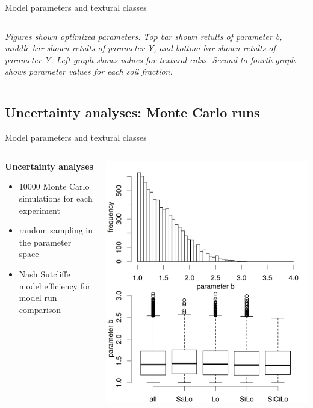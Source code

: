 \begin{block}{Model parameters and textural classes}
\begin{columns}
\begin{column}{0.8\textwidth}
        {\it Figures shown optimized parameters. Top bar shown retults of parameter b, middle bar shown retults of parameter Y, and bottom bar shown retults of parameter Y. Left graph shows values for textural calss. Second to fourth graph shows parameter values for each soil fraction.}
    \end{column}
\end{columns} 

\end{block}

% 
\subsection{Uncertainty analyses: Monte Carlo runs}
\begin{block}{Model parameters and textural classes}
\begin{columns}
    \begin{column}{0.25\textwidth}
        {\bf Uncertainty analyses}
        \begin{itemize}
            \item 10000 Monte Carlo simulations for each experiment
            \item random sampling in the parameter space
            \item Nash Sutcliffe model efficiency for model run comparison
        \end{itemize}
        \end{column}
        \begin{column}{0.25\textwidth}
            \includegraphics[width = \textwidth]{obr/mc_b.png}

\end{column}
\end{columns}
\end{block}
